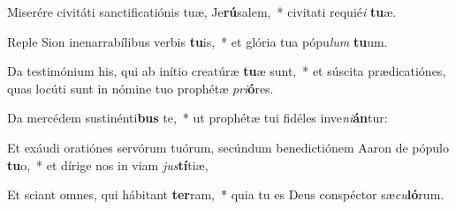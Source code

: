 \item Miserére civitáti sanctificatiónis tuæ, Je\textbf{rú}salem,~* civitati requié\textit{i} \textbf{tu}æ.
\item Reple Sion inenarrabílibus verbis \textbf{tu}is,~* et glória tua pópu\textit{lum} \textbf{tu}um.
\item Da testimónium his, qui ab inítio creatúræ \textbf{tu}æ sunt,~* et súscita prædicatiónes, quas locúti sunt in nómine tuo prophétæ \textit{pri}\textbf{ó}res.
\item Da mercédem sustinénti\textbf{bus} te,~* ut prophétæ tui fidéles inve\textit{ni}\textbf{án}tur:
\item Et exáudi oratiónes servórum tuórum, secúndum benedictiónem Aaron de pópulo \textbf{tu}o,~* et dírige nos in viam \textit{jus}\textbf{tí}tiæ,
\item Et sciant omnes, qui hábitant \textbf{ter}ram,~* quia tu es Deus conspéctor sæ\textit{cu}\textbf{ló}rum.
